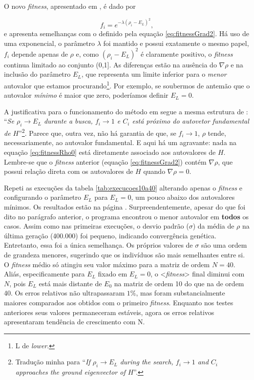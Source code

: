 	O novo \textit{fitness}, apresentado em \cite{metodo2011}, é dado por
	
	\begin{equation}\label{eq:fitnessRho0}
		f_i = e^{-\lambda(\rho_i - E_L)^2},
	\end{equation}
e apresenta semelhanças com o definido pela equação \ref{eq:fitnessGrad2}. Há uso de uma exponencial, o parâmetro $\lambda$ foi mantido e possui exatamente o mesmo papel, $f_i$ depende apenas de $\rho$ e, como $(\rho_i - E_L)^2$ é claramente positivo, o \textit{fitness} continua limitado ao conjunto (0,1]. As diferenças estão na ausência do $\nabla \rho$ e na inclusão do parâmetro $E_L$, que representa um limite inferior para o \textit{menor} autovalor que estamos procurando\footnote{L de \textit{lower}.}. Por exemplo, se soubermos de antemão que o autovalor \textit{mínimo} é maior que zero, poderíamos definir $E_L = 0$. 

	 A justificativa para o funcionamento do método em \cite{metodo2011} segue a mesma estrutura de \cite{metodo2004}: ``\textit{Se $\rho_i \rightarrow E_L$ durante a busca, $f_i \rightarrow 1$ e $C_i$ está próximo do autovetor fundamental de $H$}''\footnote{Tradução minha para ``\textit{If $\rho_i \rightarrow E_L$ during the search, $f_i \rightarrow 1$ and $C_i$ approaches the ground eigenvector of $H$}''.}. Parece que, outra vez, não há garantia de que, se $f_i \rightarrow 1$, $\rho$ tende, necessariamente, ao autovalor fundamental. E aqui há um agravante: nada na equação \ref{eq:fitnessRho0} está diretamente associado aos autovalores de $H$. Lembre-se que o \textit{fitness} anterior (equação \ref{eq:fitnessGrad2}) contém $\nabla \rho$, que possui relação direta com os autovalores de $H$ quando $\nabla \rho = 0$.
	
	Repeti as execuções da tabela \ref{tab:execucoes10a40} alterando apenas o \textit{fitness} e configurando o parâmetro $E_L$ para $E_L = 0$, um pouco abaixo dos autovalores mínimos. Os resultados estão na página \pageref{tab:execucoesNovoFitness}. Surpreendentemente, apesar do que foi dito no parágrafo anterior, o programa encontrou o menor autovalor em \textbf{todos} os casos. Assim como nas primeiras execuções, o desvio padrão ($\sigma$) da média de $\rho$ na última geração (400.000) foi pequeno, indicando convergência genética. Entretanto, essa foi a única semelhança. Os próprios valores de $\sigma$ são uma ordem de grandeza menores, sugerindo que os indivíduos são mais semelhantes entre si. O \textit{fitness} médio só atingiu seu valor máximo para a matriz de ordem $N = 40$. Aliás, especificamente para $E_L$ fixado em $E_L = 0$, o <\textit{fitness}> final diminui com $N$, pois $E_L$ está mais distante de $E_0$ na matriz de ordem 10 do que na de ordem 40. Os erros relativos não ultrapassaram $1\%$, mas foram substancialmente maiores comparados aos obtidos com o primeiro \textit{fitness}. Enquanto nos testes anteriores seus valores permaneceram estáveis, agora os erros relativos apresentaram tendência de crescimento com N.
	
